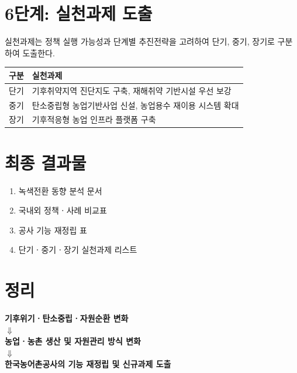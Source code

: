 \documentclass[11pt,a4paper]{article}
\begin{document}
\section*{6단계: 실천과제 도출}

실천과제는 정책 실행 가능성과 단계별 추진전략을 고려하여
단기, 중기, 장기로 구분하여 도출한다.

\begin{table}[h]
\centering
\renewcommand{\arraystretch}{1.3}
\begin{tabular}{p{3cm} p{11cm}}
\toprule
\rowcolor{gray!20}
구분 & 실천과제 \\
\midrule
단기 & 기후취약지역 진단지도 구축, 재해취약 기반시설 우선 보강 \\
중기 & 탄소중립형 농업기반사업 신설, 농업용수 재이용 시스템 확대 \\
장기 & 기후적응형 농업 인프라 플랫폼 구축 \\
\bottomrule
\end{tabular}
\end{table}

\section*{최종 결과물}

\begin{enumerate}
    \item 녹색전환 동향 분석 문서
    \item 국내외 정책ㆍ사례 비교표
    \item 공사 기능 재정립 표
    \item 단기ㆍ중기ㆍ장기 실천과제 리스트
\end{enumerate}

\section*{정리}

\begin{center}
\textbf{기후위기ㆍ탄소중립ㆍ자원순환 변화}
\\[0.5em]
$\Downarrow$
\\[0.5em]
\textbf{농업ㆍ농촌 생산 및 자원관리 방식 변화}
\\[0.5em]
$\Downarrow$
\\[0.5em]
\textbf{한국농어촌공사의 기능 재정립 및 신규과제 도출}
\end{center}
\end{document}
